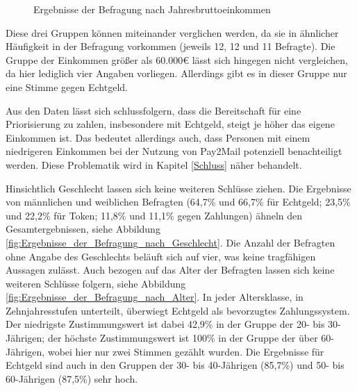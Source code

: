 \begin{figure}[!ht]
\centering
\caption[Ergebnisse der Befragung nach Jahresbruttoeinkommen]{Ergebnisse der Befragung nach Jahresbruttoeinkommen}
\label{fig:Auswahl_des_Zahlungssystems_der_Befragten_nach_Jahresbruttoeinkommen}
\end{figure}

Diese drei Gruppen können miteinander verglichen werden, da sie in ähnlicher Häufigkeit in der Befragung vorkommen (jeweils 12, 12 und 11 Befragte). Die Gruppe der Einkommen größer als 60.000€ lässt sich hingegen nicht vergleichen, da hier lediglich vier Angaben vorliegen. Allerdings gibt es in dieser Gruppe nur eine Stimme gegen Echtgeld.

Aus den Daten lässt sich schlussfolgern, dass die Bereitschaft für eine Priorisierung zu zahlen, insbesondere mit Echtgeld, steigt je höher das eigene Einkommen ist. Das bedeutet allerdings auch, dass Personen mit einem niedrigeren Einkommen bei der Nutzung von Pay2Mail potenziell benachteiligt werden. Diese Problematik wird in Kapitel \ref{Schluss} näher behandelt. 

Hinsichtlich Geschlecht lassen sich keine weiteren Schlüsse ziehen. Die Ergebnisse von männlichen und weiblichen Befragten (64,7\% und 66,7\% für Echtgeld; 23,5\% und 22,2\% für Token; 11,8\% und 11,1\% gegen Zahlungen) ähneln den Gesamtergebnissen, siehe Abbildung \ref{fig:Ergebnisse_der_Befragung_nach_Geschlecht}. Die Anzahl der Befragten ohne Angabe des Geschlechts beläuft sich auf vier, was keine tragfähigen Aussagen zulässt. Auch bezogen auf das Alter der Befragten lassen sich keine weiteren Schlüsse folgern, siehe Abbildung \ref{fig:Ergebnisse_der_Befragung_nach_Alter}. In jeder Altersklasse, in Zehnjahresstufen unterteilt, überwiegt Echtgeld als bevorzugtes Zahlungssystem. Der niedrigste Zustimmungswert ist dabei 42,9\% in der Gruppe der 20- bis 30-Jährigen; der höchste Zustimmungswert ist 100\% in der Gruppe der über 60-Jährigen, wobei hier nur zwei Stimmen gezählt wurden. Die Ergebnisse für Echtgeld sind auch in den Gruppen der 30- bis 40-Jährigen (85,7\%) und 50- bis 60-Jährigen (87,5\%) sehr hoch.

